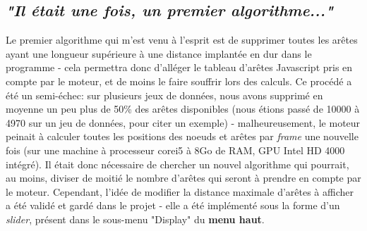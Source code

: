 \documentclass[pdftex,12pt,a4paper]{report}
\begin{document}
\begin{spacing}{1.2}
\subsection{\textit{"Il était une fois, un premier algorithme..."}}
Le premier algorithme qui m'est venu à l'esprit est de supprimer toutes les arêtes ayant une longueur supérieure à une distance implantée en dur dans le programme - cela permettra donc d'alléger le tableau d'arêtes Javascript pris en compte par le moteur, et de moins le faire souffrir lors des calculs.
\newline
Ce procédé a été un semi-échec: sur plusieurs jeux de données, nous avons supprimé en moyenne un peu plus de 50\% des arêtes disponibles (nous étions passé de 10000 à 4970 sur un jeu de données, pour citer un exemple) - malheureusement, le moteur peinait à calculer toutes les positions des noeuds et arêtes par \textit{frame} une nouvelle fois (sur une machine à processeur corei5 à 8Go de RAM, GPU Intel HD 4000 intégré).
\newline
Il était donc nécessaire de chercher un nouvel algorithme qui pourrait, au moins, diviser de moitié le nombre d'arêtes qui seront à prendre en compte par le moteur. Cependant, l'idée de modifier la distance maximale d'arêtes à afficher a été validé et gardé dans le projet - elle a été implémenté sous la forme d'un \textit{slider}, présent dans le sous-menu "Display" du \textbf{menu haut}.


\end{spacing}
\end{document}

